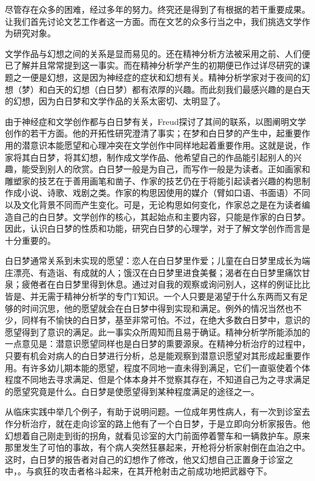 \documentclass[UTF8,10pt,a4paper,openany]{book}
\begin{document}
尽管存在众多的困难，经过多年的努力。终究还是得到了有根据的若干重要成果。让我们首先讨论文艺工作者这一方面。而在文艺的众多行当之中，我们挑选文学作为研究对象。

文学作品与幻想之间的关系是显而易见的。还在精神分析方法被采用之前、人们便已了解并且常常提到这一事实。而在精神分析学产生的初期便已作过详尽研究的课题之一便是幻想，这是因为神经症的症状和幻想有关。精神分析学家对于夜间的幻想（梦）和白天的幻想（白日梦）都有浓厚的兴趣。而此刻我们最感兴趣的是白天的幻想，因为白日梦和文学作品的关系太密切、太明显了。

由于神经症和文学创作都与白日梦有关，Freud探讨了其间的联系，以图阐明文学创作的若干方面。他的开拓性研究澄清了事实；在梦和白日梦的产生中，起重要作用的潜意识本能愿望和心理冲突在文学创作中同样地起着重要作用。这就是说，作家将其白日梦，将其幻想，制作成文学作品、他希望自己的作品能引起别人的兴趣，能受到别人的欣赏。白日梦一般是为自己，而写作一般是为读者。正如画家和雕塑家的技艺在于善用画笔和凿子、作家的技艺仍在于将能引起读者兴趣的构思制作成小说、诗歌、戏剧之类。作家的构思因使用的媒介（臂如口语、书面语）不同以及文化背景不同而产生变化。可是，无论构思如何变化，作家总之是在为读者编造自己的白日梦。文学创作的核心，其起始点和主要内容，只能是作家的白日梦。因此，认识白日梦的性质和功能，研究白日梦的心理学，对于了解文学创作而言是十分重要的。

白日梦通常关系到未实现的愿望：恋人在白日梦里作爱；儿童在白日梦里成长为端庄漂亮、有造诣、有成就的人；饿汉在白日梦里进食美餐；渴者在白日梦里痛饮甘泉；疲倦者在白日梦里得到休息。通过对自我的观察或询问别人，这样的例证比比皆是、并无需于精神分析学的专门T知识。一个人只要是渴望于什么东两而又有足够的时间沉思，他的愿望就会在白日梦中得到实现和满足。例外的情况当然也不少，同样有不愉快的白日梦，基至非常可怕。不过，在绝大多数白日梦中，意识的愿望得到了意识的满足。此一事实众所周知而且易于确证。精神分析学所能添加的一点意见是：潜意识愿望同样也是白日梦的熏要源泉。在精神分析治疗的过程中，只要有机会对病人的白日梦进行分析，总是能观察到潜意识愿望对其形成起重要作用。有许多幼儿期本能的愿望，程度不同地一直未得到满足，它们一直驱使着个体程度不同地去寻求满足、但是个体本身并不觉察其存在，不知道自己为之寻求满足的愿望究竟是什么。白日梦是使愿望得到某种程度满足的途径之一。

从临床实践中举几个例子，有助于说明问题。一位成年男性病人，有一次到诊室去作分析治疗，就在走向诊室的路上他有了一个白日梦，于是立即向分析家报告。他幻想着自己刚走到街的拐角，就看见诊室的大门前面停着警车和一辆救护车。原来那里发生了可怕的事故，有个病人突然狂暴起来，开枪将分析家射倒在血泊之中。这时，白日梦的报告者对自己的幻想作了修改，他又幻想自己正置身于诊室之中，。与疯狂的攻击者格斗起来，在其开枪射击之前成功地把武器夺下。
\end{document}
